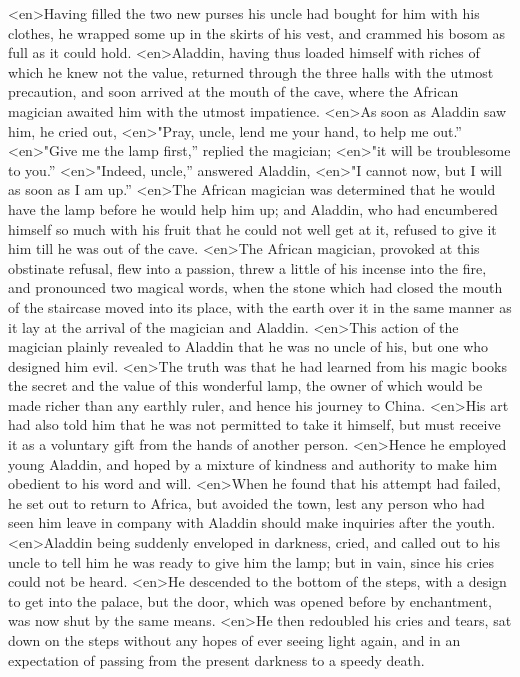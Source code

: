 <en>Having filled the two new purses his uncle had bought for him with his clothes, he wrapped some up in the skirts of his vest, and crammed his bosom as full as it could hold.
<en>Aladdin, having thus loaded himself with riches of which he knew not the value, returned through the three halls with the utmost precaution, and soon arrived at the mouth of the cave, where the African magician awaited him with the utmost impatience.
<en>As soon as Aladdin saw him, he cried out,
<en>"Pray, uncle, lend me your hand, to help me out.”
<en>"Give me the lamp first,” replied the magician;
<en>"it will be troublesome to you.”
<en>"Indeed, uncle,” answered Aladdin,
<en>"I cannot now, but I will as soon as I am up.”
<en>The African magician was determined that he would have the lamp before he would help him up; and Aladdin, who had encumbered himself so much with his fruit that he could not well get at it, refused to give it him till he was out of the cave.
<en>The African magician, provoked at this obstinate refusal, flew into a passion, threw a little of his incense into the fire, and pronounced two magical words, when the stone which had closed the mouth of the staircase moved into its place, with the earth over it in the same manner as it lay at the arrival of the magician and Aladdin.
<en>This action of the magician plainly revealed to Aladdin that he was no uncle of his, but one who designed him evil.
<en>The truth was that he had learned from his magic books the secret and the value of this wonderful lamp, the owner of which would be made richer than any earthly ruler, and hence his journey to China.
<en>His art had also told him that he was not permitted to take it himself, but must receive it as a voluntary gift from the hands of another person.
<en>Hence he employed young Aladdin, and hoped by a mixture of kindness and authority to make him obedient to his word and will.
<en>When he found that his attempt had failed, he set out to return to Africa, but avoided the town, lest any person who had seen him leave in company with Aladdin should make inquiries after the youth.
<en>Aladdin being suddenly enveloped in darkness, cried, and called out to his uncle to tell him he was ready to give him the lamp; but in vain, since his cries could not be heard.
<en>He descended to the bottom of the steps, with a design to get into the palace, but the door, which was opened before by enchantment, was now shut by the same means.
<en>He then redoubled his cries and tears, sat down on the steps without any hopes of ever seeing light again, and in an expectation of passing from the present darkness to a speedy death.
